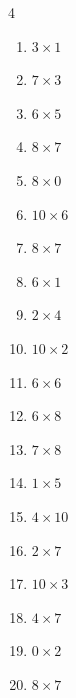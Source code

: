 \begin{multicols}{4}
\begin{enumerate}
  \item $3\times 1$
        \phantom{$=3$}

  \item $7\times 3$
        \phantom{$=21$}

  \item $6\times 5$
        \phantom{$=30$}

\columnbreak %

\resetques

  \item $8\times 7$
        \phantom{$=56$}

  \item $8\times 0$
        \phantom{$=0$}

  \item $10\times 6$
        \phantom{$=60$}

  \item $8\times 7$
        \phantom{$=56$}

  \item $6\times 1$
        \phantom{$=6$}

  \item $2\times 4$
        \phantom{$=8$}

  \item $10\times 2$
        \phantom{$=20$}

  \item $6\times 6$
        \phantom{$=36$}

  \item $6\times 8$
        \phantom{$=48$}

  \item $7\times 8$
        \phantom{$=56$}

  \item $1\times 5$
        \phantom{$=5$}

  \item $4\times 10$
        \phantom{$=40$}

  \item $2\times 7$
        \phantom{$=14$}

  \item $10\times 3$
        \phantom{$=30$}

  \item $4\times 7$
        \phantom{$=28$}

  \item $0\times 2$
        \phantom{$=0$}

  \item $8\times 7$
        \phantom{$=56$}


\end{enumerate}
\end{multicols}
